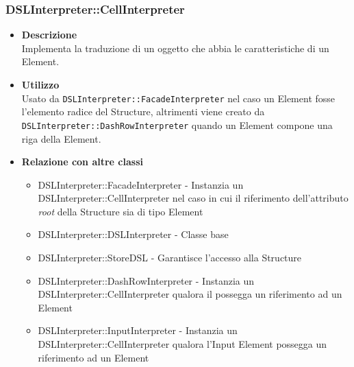 \subsubsection{DSLInterpreter::CellInterpreter}
\begin{itemize}
\item \textbf{Descrizione} \hfill \\
Implementa la traduzione di un oggetto che abbia le caratteristiche di un  Element.
\item \textbf{Utilizzo} \hfill \\
Usato da \texttt{DSLInterpreter::FacadeInterpreter} nel caso un  Element fosse l'elemento radice del  Structure, altrimenti viene creato da \\\texttt{DSLInterpreter::DashRowInterpreter} quando un  Element compone una riga della  Element.
\item \textbf{Relazione con altre classi}
\begin{itemize}
\item DSLInterpreter::FacadeInterpreter - Instanzia un DSLInterpreter::CellInterpreter nel caso in cui il riferimento dell'attributo \textit{root} della  Structure sia di tipo  Element 
\item DSLInterpreter::DSLInterpreter - Classe base
\item DSLInterpreter::StoreDSL - Garantisce l'accesso alla  Structure
\item DSLInterpreter::DashRowInterpreter - Instanzia un DSLInterpreter::CellInterpreter qualora il  possegga un riferimento ad un  Element
\item DSLInterpreter::InputInterpreter - Instanzia un DSLInterpreter::CellInterpreter qualora l'Input Element possegga un riferimento ad un  Element
\end{itemize}
\end{itemize}

